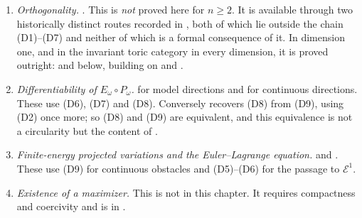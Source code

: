 \begin{enumerate}
continuous obstacle.  \emph{They do not use orthogonality.}
\item[\textup{(D8)}]
\emph{Orthogonality.}  .  This is
\emph{not} proved here for \(n\geq2\).  It is available through two
historically distinct routes recorded in
, both of which lie outside the chain
\textup{(D1)}--\textup{(D7)} and neither of which is a formal consequence of
it.  In dimension one, and in the invariant toric category in every
dimension, it is proved outright:
 and
 below, building on
 and
.
\item[\textup{(D9)}]
\emph{Differentiability of \(E_\omega\circ P_\omega\).}
 for model directions and
 for continuous directions.
These use \textup{(D6)}, \textup{(D7)} and \textup{(D8)}.  Conversely
 recovers \textup{(D8)} from
\textup{(D9)}, using \textup{(D2)} once more; so \textup{(D8)} and
\textup{(D9)} are equivalent, and this equivalence is not a circularity but
the content of .
\item[\textup{(D10)}]
\emph{Finite-energy projected variations and the Euler--Lagrange equation.}
 and .  These
use \textup{(D9)} for continuous obstacles and \textup{(D5)}--\textup{(D6)}
for the passage to \(\mathcal E^1\).
\item[\textup{(D11)}]
\emph{Existence of a maximizer.}  This is not in this chapter.  It requires
compactness and coercivity and is
 in .
\end{enumerate}


